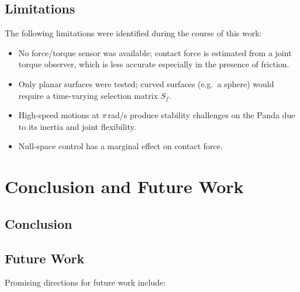 \documentclass[
	german,%
	accentcolor=9c,%
	ruledheaders=section,%
	class=report,%
	thesis={type=bachelor},%
	fontsize=11pt,%
	parskip=half-,%
	custommargins=true,%
	marginpar=false,%
]{tudapub}
\begin{document}


\section{Limitations}

The following limitations were identified during the course of this work:

\begin{itemize}
    \item No force/torque sensor was available; contact force is estimated
          from a joint torque observer, which is less accurate especially
          in the presence of friction.
    \item Only planar surfaces were tested; curved surfaces (e.g.\ a sphere)
          would require a time-varying selection matrix $S_f$.
    \item High-speed motions at $\pi$\,rad/s produce stability challenges on
          the Panda due to its inertia and joint flexibility.
    \item Null-space control has a marginal effect on contact force.
\end{itemize}


\chapter{Conclusion and Future Work}

\section{Conclusion}



\section{Future Work}

Promising directions for future work include:
\end{document}
